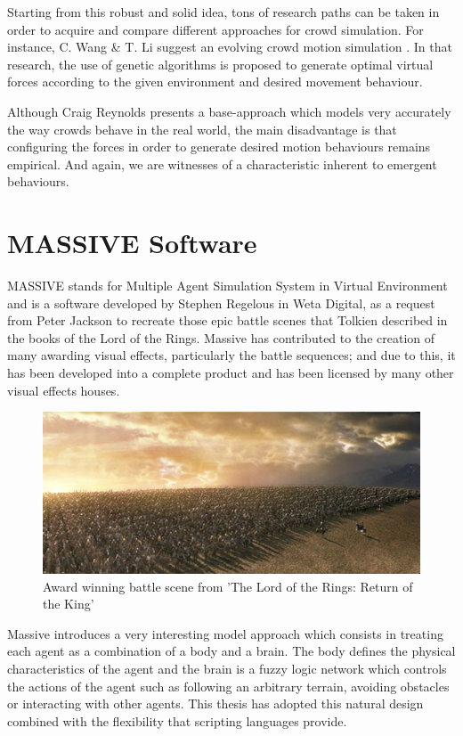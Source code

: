 Starting from this robust and solid idea, tons of research paths can be taken in order to acquire and compare different approaches for crowd simulation. For instance, C. Wang \& T. Li suggest an evolving crowd motion simulation \citep{wang}. In that research, the use of genetic algorithms is proposed to generate optimal virtual forces according to the given environment and desired movement behaviour.

Although Craig Reynolds presents a base-approach which models very accurately the way crowds behave in the real world, the main disadvantage is that configuring the forces in order to generate desired motion behaviours remains empirical. And again, we are witnesses of a characteristic inherent to emergent behaviours.

\section{MASSIVE Software}

MASSIVE stands for Multiple Agent Simulation System in Virtual Environment and is a software developed by Stephen Regelous in Weta Digital, as a request from Peter Jackson to recreate those epic battle scenes that Tolkien described in the books of the Lord of the Rings. Massive has contributed to the creation of many awarding visual effects, particularly  the battle sequences; and due to this, it has been developed into a complete product and has been licensed by many other visual effects houses.

\begin{figure}[!htb]
  \centering
  \includegraphics[scale=0.5]{rohan_army.eps}
  \caption[Massive Software]{Award winning battle scene from 'The Lord of the Rings: Return of the King'}
  \label{fig:massive}
\end{figure}

Massive introduces a very interesting model approach which consists in treating each agent as a combination of a body and a brain. The body defines the physical characteristics of the agent and the brain is a fuzzy logic network which controls the actions of the agent such as following an arbitrary terrain, avoiding obstacles or interacting with other agents. This thesis has adopted this natural design combined with the flexibility that scripting languages provide.

